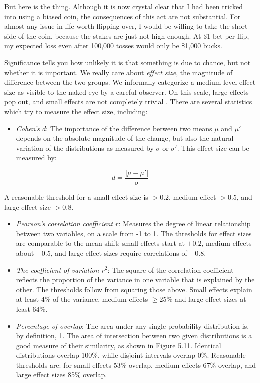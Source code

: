 \documentclass[10pt]{article}
\begin{document}
But here is the thing. Although it is now crystal clear that I had been tricked into using a biased coin, the consequences of this act are not substantial. For almost any issue in life worth flipping over, I would be willing to take the short side of the coin, because the stakes are just not high enough. At \$1 bet per flip, my expected loss even after 100,000 tosses would only be \$1,000 bucks.

Significance tells you how unlikely it is that something is due to chance, but not whether it is important. We really care about \textit{effect size}, the magnitude of difference between the two groups. We informally categorize a medium-level effect size as visible to the naked eye by a careful observer. On this scale, large effects pop out, and small effects are not completely trivial \cite{SF12}. There are several statistics which try to measure the effect size, including:

\begin{itemize}
  \item \textit{Cohen's $d$}: The importance of the difference between two means $\mu$ and $\mu'$ depends on the absolute magnitude of the change, but also the natural variation of the distributions as measured by $\sigma$ or $\sigma'$. This effect size can be measured by:
\end{itemize}

\[
d = \frac{\left| \mu - \mu' \right|}{\sigma}
\]

A reasonable threshold for a small effect size is $>0.2$, medium effect $>0.5$, and large effect size $>0.8$.

\begin{itemize}
  \item \textit{Pearson's correlation coefficient $r$}: Measures the degree of linear relationship between two variables, on a scale from -1 to 1. The thresholds for effect sizes are comparable to the mean shift: small effects start at $\pm 0.2$, medium effects about $\pm 0.5$, and large effect sizes require correlations of $\pm 0.8$.
  \item \textit{The coefficient of variation $r^{2}$}: The square of the correlation coefficient reflects the proportion of the variance in one variable that is explained by the other. The thresholds follow from squaring those above. Small effects explain at least 4\% of the variance, medium effects $\geq 25\%$ and large effect sizes at least 64\%.
  \item \textit{Percentage of overlap}: The area under any single probability distribution is, by definition, 1. The area of intersection between two given distributions is a good measure of their similarity, as shown in Figure 5.11. Identical distributions overlap 100\%, while disjoint intervals overlap 0\%. Reasonable thresholds are: for small effects 53\% overlap, medium effects 67\% overlap, and large effect sizes 85\% overlap.
\end{itemize}
\end{document}
